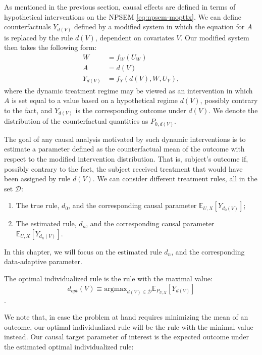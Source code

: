 \documentclass[12pt, krantz2,]{krantz}
\theoremstyle{definition}
\theoremstyle{definition}
\theoremstyle{definition}
\newcommand{\E}{\mathbb{E}}
\newcommand{\1}{\mathbbm{1}}
\begin{document}
As mentioned in the previous section, causal effects are defined in terms of
hypothetical interventions on the NPSEM \eqref{eq:npsem-mopttx}. We can define
counterfactuals \(Y_{d(V)}\) defined by a modified system in which the equation
for \(A\) is replaced by the rule \(d(V)\), dependent on covariates \(V\). Our
modified system then takes the following form:
\begin{align}
  W &= f_W(U_W) \\ A &= d(V) \\ Y_{d(V)} &= f_Y(d(V), W, U_Y),
  \label{eq:npsem-causal-mopttx}
\end{align}
where the dynamic treatment regime may be viewed as an intervention in which \(A\)
is set equal to a value based on a hypothetical regime \(d(V)\), possibly contrary
to the fact, and \(Y_{d(V)}\) is the corresponding outcome under \(d(V)\). We
denote the distribution of the counterfactual quantities as \(P_{0,d(V)}\).

The goal of any causal analysis motivated by such dynamic interventions is to
estimate a parameter defined as the counterfactual mean of the outcome with
respect to the modified intervention distribution. That is, subject's outcome
if, possibly contrary to the fact, the subject received treatment that would
have been assigned by rule \(d(V)\). We can consider different treatment rules,
all in the set \(\mathcal{D}\):

\begin{enumerate}
\def\labelenumi{\arabic{enumi}.}
\item
  The true rule, \(d_0\), and the corresponding causal parameter
  \(\E_{U,X}[Y_{d_0(V)}]\);
\item
  The estimated rule, \(d_n\), and the corresponding causal parameter
  \(\E_{U,X}[Y_{d_n(V)}]\).
\end{enumerate}

In this chapter, we will focus on the estimated rule \(d_n\), and the
corresponding data-adaptive parameter.

The optimal individualized rule is the rule with the maximal value:
\[d_{opt}(V) \equiv \text{argmax}_{d(V) \in \mathcal{D}}
\E_{P_{U,X}}[Y_{d(V)}]\].

We note that, in case the problem at hand requires minimizing the mean of an
outcome, our optimal individualized rule will be the rule with the minimal value
instead. Our causal target parameter of interest is the expected outcome under
the estimated optimal individualized rule:
\end{document}
